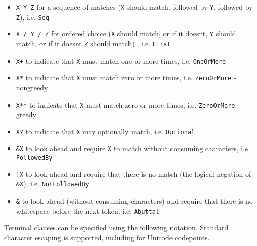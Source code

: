 \begin{itemize}
\item \texttt{X Y Z} for a sequence of matches (\texttt{X} should match, followed by \texttt{Y},
followed by \texttt{Z}), i.e. \texttt{Seq}

\item \texttt{X / Y / Z} for ordered choice (\texttt{X} should match, or if it doesn\textquotesingle{}t, \texttt{Y}
should match, or if it doesn\textquotesingle{}t\textquotesingle{} \texttt{Z} should match) , i.e. \texttt{First}

\item \texttt{X+} to indicate that \texttt{X} must match one or more times, i.e. \texttt{OneOrMore}

\item \texttt{X*} to indicate that \texttt{X} must match zero or more times, i.e. \texttt{ZeroOrMore} - nongreedy

\item \texttt{X**} to indicate that \texttt{X} must match zero or more times, i.e. \texttt{ZeroOrMore} - greedy

\item \texttt{X?} to indicate that \texttt{X} may optionally match, i.e. \texttt{Optional}

\item \texttt{\&X} to look ahead and require \texttt{X} to match without consuming characters, i.e. \texttt{FollowedBy}

\item \texttt{!X} to look ahead and require that there is no match (the logical negation of \texttt{\&X}), i.e. \texttt{NotFollowedBy}

\item \texttt{\&\textbar{}} to look ahead (without consuming characters) and require that there is no whitespace before the next token, i.e. \texttt{Abuttal}

\end{itemize}

Terminal clauses can be specified using the following notation. Standard
character escaping is supported, including for Unicode codepoints.

